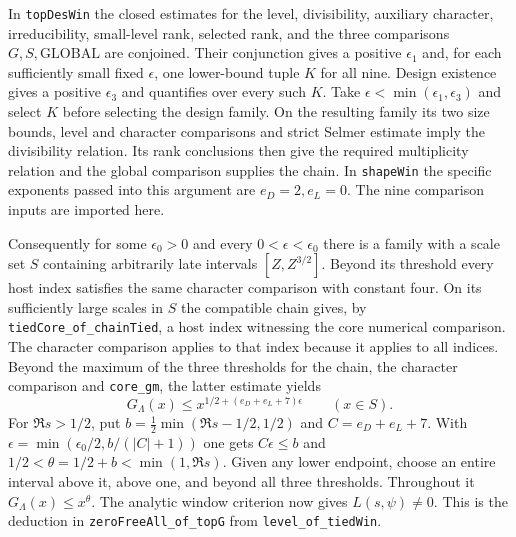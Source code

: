 In \texttt{topDesWin} the closed estimates for the level, divisibility,
auxiliary character, irreducibility, small-level rank, selected rank,
and the three comparisons $G,S,\mathrm{GLOBAL}$ are conjoined. Their
conjunction gives a positive $\epsilon_1$ and, for each sufficiently
small fixed $\epsilon$, one lower-bound tuple $K$ for all nine.
Design existence gives a positive $\epsilon_3$ and quantifies over
every such $K$. Take $\epsilon<\min(\epsilon_1,\epsilon_3)$ and
select $K$ before selecting the design family. On the resulting
family its two size bounds, level and character comparisons and
strict Selmer estimate imply the divisibility relation. Its rank
conclusions then give the required multiplicity relation and the
global comparison supplies the chain. In \texttt{shapeWin} the
specific exponents passed into this argument are $e_D=2,e_L=0$.
The nine comparison inputs are imported here.

Consequently for some $\epsilon_0>0$ and every $0<\epsilon<\epsilon_0$
there is a family with a scale set $S$ containing arbitrarily late
intervals $[Z,Z^{3/2}]$. Beyond its threshold every host index
satisfies the same character comparison with constant four. On its
sufficiently large scales in $S$ the compatible chain gives, by
\texttt{tiedCore\_of\_chainTied}, a host index witnessing the core
numerical comparison. The character comparison applies to that index
because it applies to all indices. Beyond the maximum of the three
thresholds for the chain, the character comparison and
\texttt{core\_gm}, the latter estimate yields
\[
        G_\Lambda(x)\le x^{1/2+(e_D+e_L+7)\epsilon}\qquad(x\in S).
\]
For $\Re s>1/2$, put $b=\tfrac12\min(\Re s-1/2,1/2)$ and
$C=e_D+e_L+7$. With $\epsilon=\min(\epsilon_0/2,b/(|C|+1))$ one
gets $C\epsilon\le b$ and $1/2<\theta=1/2+b<\min(1,\Re s)$.
Given any lower endpoint, choose an entire interval above it, above
one, and beyond all three thresholds. Throughout it $G_\Lambda(x)
\le x^\theta$. The analytic window criterion now gives
$L(s,\psi)\ne0$. This is the deduction in
\texttt{zeroFreeAll\_of\_topG} from \texttt{level\_of\_tiedWin}.
